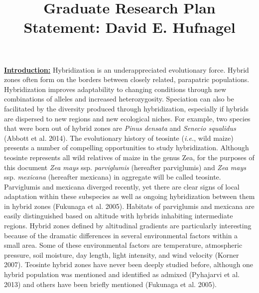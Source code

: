 \documentclass[12pt]{amsart}
\title{Graduate Research Plan Statement: David E. Hufnagel}
\begin{document}
\maketitle

\textbf{\underline{Introduction:} }
Hybridization is an underappreciated evolutionary force.
Hybrid zones often form on the borders between closely related, parapatric populations. %
Hybridization improves adaptability to changing conditions through new combinations of alleles and increased heterozygosity.
Speciation can also be facilitated by the diversity produced through hybridization, especially if hybrids are dispersed to new regions and new ecological niches.
For example, two species that were born out of hybrid zones are \textit{Pinus densata} and \textit{Senecio squalidus} (Abbott et al. 2014).
The evolutionary history of teosinte (\emph{i.e.}, wild maize) presents a number of compelling opportunities to study hybridization.
Although teosinte represents all wild relatives of maize in the genus {Zea}, for the purposes of this document \textit{Zea mays} ssp. \textit{parviglumis} (hereafter parviglumis) and \textit{Zea mays} ssp. \textit{mexicana} (hereafter mexicana) in aggregate will be called teosinte. 
Parviglumis and mexicana diverged recently, yet there are clear signs of local adaptation within these subspecies as well as ongoing hybridization between them in hybrid zones (Fukunaga et al. 2005).
Habitats of parviglumis and mexicana are easily distinguished based on altitude with hybrids inhabiting intermediate regions.
Hybrid zones defined by altitudinal gradients are particularly interesting because of the dramatic differences in several environmental factors within a small area.
Some of these environmental factors are temperature, atmospheric pressure, soil moisture, day length, light intensity, and wind velocity (Korner 2007).
Teosinte hybrid zones have never been deeply studied before, although one hybrid population was mentioned and identified as admixed (Pyhajarvi et al. 2013)  and others have been briefly mentioned (Fukunaga et al. 2005).
\end{document}
